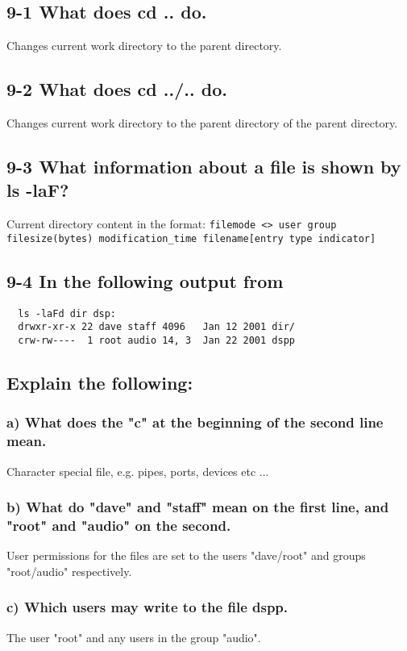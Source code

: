 \subsection{9-1 What does cd .. do.}
Changes current work directory to the parent directory.

\subsection{9-2 What does cd ../.. do.}
Changes current work directory to the parent directory of the parent directory.

\subsection{9-3 What information about a file is shown by ls -laF?}
Current directory content in the format:
\verb=filemode <> user group filesize(bytes) modification_time filename[entry type indicator]=

\subsection{9-4 In the following output from}
\begin{verbatim}
  ls -laFd dir dsp:
  drwxr-xr-x 22 dave staff 4096   Jan 12 2001 dir/
  crw-rw----  1 root audio 14, 3  Jan 22 2001 dspp
\end{verbatim}
\subsection{Explain the following:}
\subsubsection{a) What does the "c" at the beginning of the second line mean.}
Character special file, e.g. pipes, ports, devices etc ...

\subsubsection{b) What do "dave" and "staff" mean on the first line, and "root" and "audio" on the second.}
User permissions for the files are set to the users "dave/root" and groups "root/audio" respectively.

\subsubsection{c) Which users may write to the file dspp.}
The user "root" and any users in the group "audio".

